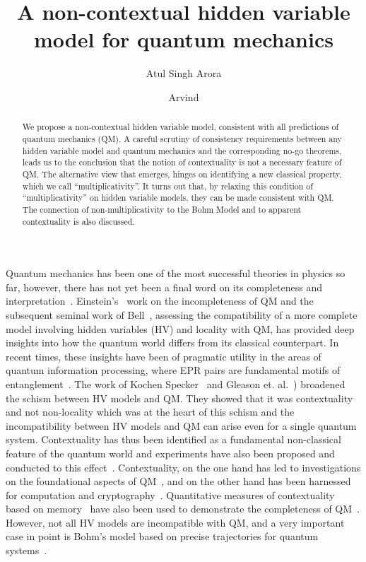 \documentclass[british,aps,prl,superscriptaddress,nofootinbib,times,reprint]{revtex4-1}
\theoremstyle{plain}
\theoremstyle{plain}
\theoremstyle{definition}
\theoremstyle{remark}
\theoremstyle{remark}
\theoremstyle{remark}
\theoremstyle{plain}
\theoremstyle{plain}
\theoremstyle{plain}
\theoremstyle{definition}
\theoremstyle{definition}
\begin{document}
\title{A non-contextual hidden variable model for quantum mechanics}
\author{Atul Singh Arora}
%
\author{Arvind}
%
\begin{abstract}
We propose a non-contextual hidden variable model,
consistent with all predictions of quantum
mechanics (QM).  A careful scrutiny of consistency
requirements between any hidden variable model and
quantum mechanics and the corresponding no-go
theorems, leads us to the conclusion that the
notion of contextuality is not a necessary feature
of QM.  The alternative view that emerges, hinges
on identifying a new classical property, which we
call ``multiplicativity''.  It turns out that, by
relaxing this condition of ``multiplicativity'' on
hidden variable models, they can be made
consistent with QM.  The connection of
non-multiplicativity to the Bohm Model and to
apparent contextuality is also discussed.
\end{abstract}
\pacs{}
\maketitle
Quantum mechanics has been one of the most
successful theories in physics so far, however,
there has not yet been a final word on its
completeness and interpretation~\cite{??}.
Einstein's~\cite{EinsteinEPR} work on the
incompleteness of QM and the subsequent seminal
work of Bell~\cite{Bell1964}, assessing the
compatibility of a more complete model involving
hidden variables (HV) and locality with QM, has
provided deep insights into  how the quantum world
differs from its classical counterpart.  In recent
times, these insights have been of pragmatic
utility in the areas of quantum information
processing, where EPR pairs are fundamental motifs
of entanglement~\cite{Ekert,PironioRndmnssCrtfcn}.
The work of  Kochen Specker~\cite{KochenSpecker}
and Gleason et.
al.~\cite{Gleason,BellOnHiddenVariables,Peres,Mermin})
broadened the schism between  HV models and QM.
They showed that it was contextuality and not
non-locality which was at the heart of this schism
and the incompatibility between HV models and QM
can arise even for a single quantum system.
Contextuality has thus been identified as a
fundamental non-classical feature of the quantum
world and experiments have also been proposed and
conducted to this effect~\cite{SimonContExpProp,
HuangContExp,YangContExp,HasegawaContExp}.
Contextuality, on the one hand has led to
investigations on the foundational aspects of
QM~\cite{PawelCntxClsscl,?????}, and on the other
hand has been harnessed for computation and
cryptography~\cite{HowardCntxCmptn,CabelloCntxScrt,??}.
Quantitative measures of contextuality based on
memory~\cite{MatthiasCntxMmry} have also been used
to demonstrate the completeness of
QM~\cite{CabelloMmryQM}.  However, not all HV
models are incompatible with QM, and a very
important case in point is  Bohm's model based on
precise trajectories for quantum
systems~\cite{Bohm1,Bohm2}. 
\end{document}
